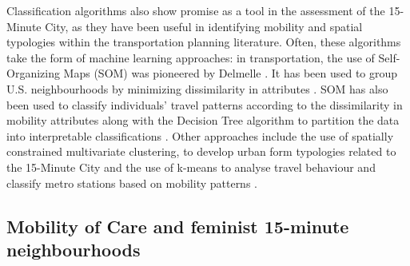 \documentclass[
  authoryear,
  preprint,
  3p]{elsarticle}
\begin{document}
Classification algorithms also show promise as a tool in the assessment
of the 15-Minute City, as they have been useful in identifying mobility
and spatial typologies within the transportation planning literature.
Often, these algorithms take the form of machine learning approaches: in
transportation, the use of Self-Organizing Maps (SOM) was pioneered by
Delmelle \citeyearpar{delmelle_spatial_2012}. It has been used to group
U.S. neighbourhoods by minimizing dissimilarity in attributes
\citep{delmelleDifferentiatingPathwaysNeighborhood2017}. SOM has also
been used to classify individuals' travel patterns according to the
dissimilarity in mobility attributes along with the Decision Tree
algorithm to partition the data into interpretable classifications
\citep{victorianoTimeSpaceMoney2020}. Other approaches include the use
of spatially constrained multivariate clustering, to develop urban form
typologies related to the 15-Minute City
\citep{burkeGeospatialAnalysisFramework2022} and the use of k-means to
analyse travel behaviour and classify metro stations based on mobility
patterns \citep{ganUnderstandingUrbanMobility2020}.

\subsection{Mobility of Care and feminist 15-minute
neighbourhoods}\label{mobility-of-care-and-feminist-15-minute-neighbourhoods}
\end{document}
